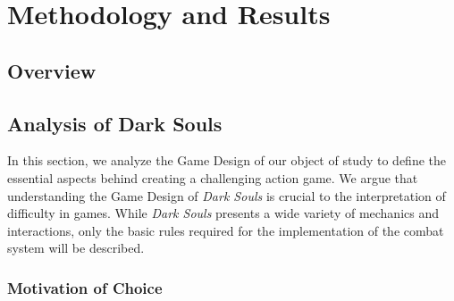 \documentclass[cic,tc,english]{iiufrgs}
\begin{document}


\chapter{Methodology and Results}

\section{Overview}






\section{Analysis of Dark Souls}

In this section, we analyze the Game Design of our object of study to define the essential aspects behind creating a challenging action game. We argue that understanding the Game Design of \emph{Dark Souls} is crucial to the interpretation of difficulty in games. While \emph{Dark Souls} presents a wide variety of mechanics and interactions, only the basic rules required for the implementation of the combat system will be described.

\subsection{Motivation of Choice}
\end{document}
